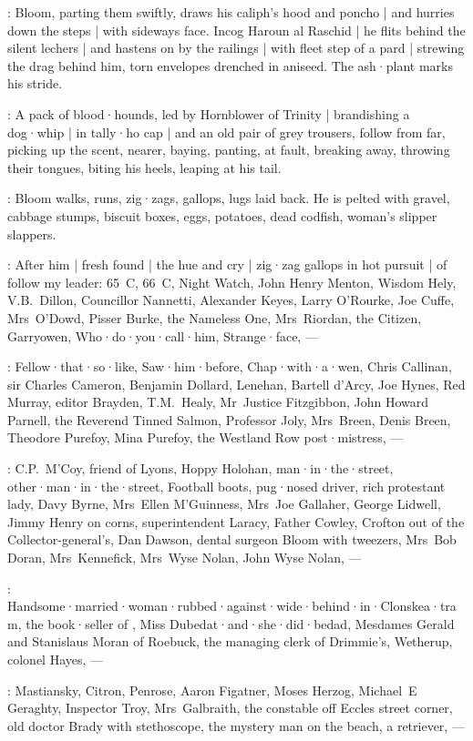 :
Bloom,
parting them swiftly,
draws his caliph's hood and poncho |
and hurries down the steps |
with sideways face.
Incog Haroun al Raschid |
he flits behind the silent lechers |
and hastens on by the railings |
with fleet step of a pard |
strewing the drag behind him,
torn envelopes drenched in aniseed.
The ash·plant marks his stride.

:
A pack of blood·hounds,
led by Hornblower of Trinity |
brandishing a dog·whip |
in tally·ho cap |
and an old pair of grey trousers,
%
follow from far,
picking up the scent,
nearer,
baying,
panting,
at fault,
breaking away,
throwing their tongues,
biting his heels,
leaping at his tail.

:
Bloom walks,
runs,
zig·zags,
gallops,
lugs laid back.
He is pelted with gravel,
cabbage stumps,
biscuit boxes,
eggs,
potatoes,
dead codfish,
woman's slipper slappers.

:
After him |
fresh found |
the hue and cry |
zig·zag gallops in hot pursuit |
of follow my leader:
65~C,
66~C,
Night Watch,
John Henry Menton,
Wisdom Hely,
V.B.~Dillon,
Councillor Nannetti,
Alexander Keyes,
Larry O'Rourke,
Joe Cuffe,
Mrs~O'Dowd,
Pisser Burke,
the Nameless One,
Mrs~Riordan,
the Citizen,
Garryowen,
Who·do·you·call·him,
Strange·face,
---

:
Fellow·that·so·like,
Saw·him·before,
Chap·with·a·wen,
Chris Callinan,
sir Charles Cameron,
Benjamin Dollard,
Lenehan,
Bartell d'Arcy,
Joe Hynes,
Red Murray,
editor Brayden,
T.M.~Healy,
Mr~Justice Fitzgibbon,
John Howard Parnell,
the Reverend Tinned Salmon,
Professor Joly,
Mrs~Breen,
Denis Breen,
Theodore Purefoy,
Mina Purefoy,
the Westland Row post·mistress,
---

:
C.P.~M'Coy,
friend of Lyons,
Hoppy Holohan,
man·in·the·street,
other·man·in·the·street,
Football boots,
pug·nosed driver,
rich protestant lady,
Davy Byrne,
Mrs~Ellen M'Guinness,
Mrs~Joe Gallaher,
George Lidwell,
Jimmy Henry on corns,
superintendent Laracy,
Father Cowley,
%
Crofton out of the Collector-general's,
Dan Dawson,
dental surgeon Bloom with tweezers,
Mrs~Bob Doran,
Mrs~Kennefick,
Mrs~Wyse Nolan,
John Wyse Nolan,
---

:
Handsome·married·woman·rubbed·against·wide·behind·in·Clonskea·tram,
the book·seller of ,
Miss Dubedat·and·she·did·bedad,
Mesdames Gerald and Stanislaus Moran of Roebuck,
the managing clerk of Drimmie's,
Wetherup,
colonel Hayes,
---

:
Mastiansky,
Citron,
Penrose,
Aaron Figatner,
Moses Herzog,
Michael~E Geraghty,
Inspector Troy,
Mrs~Galbraith,
the constable off Eccles street corner,
old doctor Brady with stethoscope,
the mystery man on the beach,
a retriever,
---

